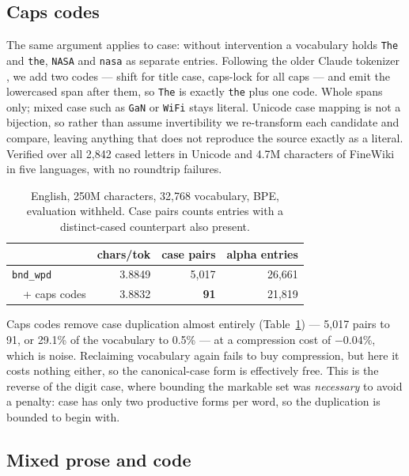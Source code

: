 \documentclass[11pt]{article}
\newcommand{\bnd}[1]{\texttt{bnd\_#1}}
\begin{document}
\subsection{Caps codes}
\label{sec:caps}

The same argument applies to case: without intervention a vocabulary holds \texttt{The} and
\texttt{the}, \texttt{NASA} and \texttt{nasa} as separate entries. Following the older Claude
tokenizer \citep{tokencontributions-claude}, we add two codes --- shift for title case,
caps-lock for all caps --- and emit the lowercased span after them, so \texttt{The} is
exactly \texttt{the} plus one code. Whole spans only; mixed case such as \texttt{GaN} or
\texttt{WiFi} stays literal. Unicode case mapping is not a bijection, so rather than assume
invertibility we re-transform each candidate and compare, leaving anything that does not
reproduce the source exactly as a literal. Verified over all 2{,}842 cased letters in
Unicode and 4.7M characters of FineWiki in five languages, with no roundtrip failures.

\begin{table}[t]
\centering
\small
\begin{tabular}{lrrr}
\toprule
& chars/tok & case pairs & alpha entries \\
\midrule
\bnd{wpd}           & 3.8849 & 5{,}017 & 26{,}661 \\
\ \ + caps codes    & 3.8832 & \textbf{91} & 21{,}819 \\
\bottomrule
\end{tabular}
\caption{English, 250M characters, 32{,}768 vocabulary, BPE, evaluation withheld. Case pairs
counts entries with a distinct-cased counterpart also present.}
\label{tab:caps}
\end{table}

Caps codes remove case duplication almost entirely (Table~\ref{tab:caps}) --- 5{,}017 pairs
to 91, or 29.1\% of the vocabulary to 0.5\% --- at a compression cost of $-0.04\%$, which is
noise. Reclaiming vocabulary again fails to buy compression, but here it costs nothing
either, so the canonical-case form is effectively free. This is the reverse of the digit
case, where bounding the markable set was \emph{necessary} to avoid a penalty: case has only
two productive forms per word, so the duplication is bounded to begin with.

\subsection{Mixed prose and code}
\label{sec:code}
\end{document}
